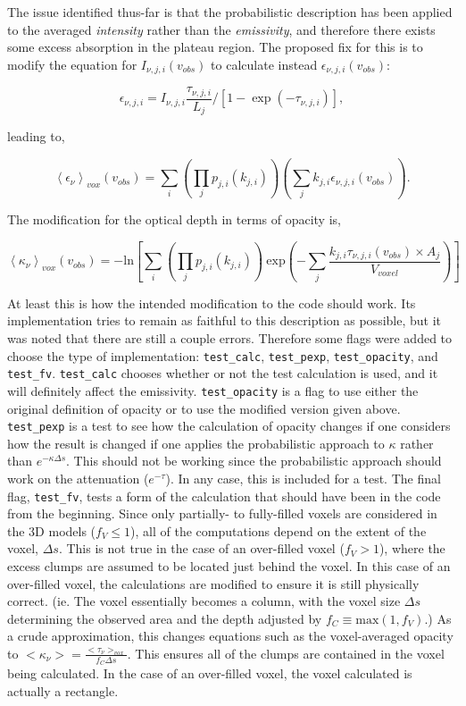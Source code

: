 \documentclass[a4paper]{article}
\begin{document}
    The issue identified thus-far is that the probabilistic description has been applied to the averaged \textit{intensity} rather than the \textit{emissivity}, and therefore there exists some excess absorption in the plateau region.
    The proposed fix for this is to modify the equation for \(I_{\nu, j, i} (v_{obs})\) to calculate instead \(\epsilon_{\nu, j, i} (v_{obs})\):

    \[
    \epsilon_{\nu,j,i} = I_{\nu,j,i} \frac{\tau_{\nu,j,i}} {L_{j}} / [ 1 - \exp(-\tau_{\nu,j,i}) ],
    \]

    leading to,

    \[
    \left< \epsilon_\nu \right>_{vox} (v_{obs}) = \sum_i \left( \prod_j p_{j,i}(k_{j,i}) \right) \left( \sum_j k_{j,i} \epsilon_{\nu,j,i} (v_{obs}) \right).
    \]

    The modification for the optical depth in terms of opacity is,

    \[
    \left< \kappa_\nu \right>_{vox} (v_{obs}) = -\mathrm{ln} \left[ \sum_i \left( \prod_j p_{j,i}(k_{j,i}) \right) \ \mathrm{exp} \left( - \sum_j \frac{k_{j,i} \tau_{\nu,j,i} (v_{obs}) \times A_{j}}{V_{voxel}} \right) \right]
    \]

    At least this is how the intended modification to the code should work.
    Its implementation tries to remain as faithful to this description as possible, but it was noted that there are still a couple errors.
    Therefore some flags were added to choose the type of implementation: \texttt{test\_calc}, \texttt{test\_pexp}, \texttt{test\_opacity}, and \texttt{test\_fv}.
    \texttt{test\_calc} chooses whether or not the test calculation is used, and it will definitely affect the emissivity.
    \texttt{test\_opacity} is a flag to use either the original definition of opacity or to use the modified version given above.
    \texttt{test\_pexp} is a test to see how the calculation of opacity changes if one considers how the result is changed if one applies the probabilistic approach to \(\kappa\) rather than \(e^{-\kappa \Delta s}\).
    This should not be working since the probabilistic approach should work on the attenuation (\(e^{-\tau}\)).
    In any case, this is included for a test.
    The final flag, \texttt{test\_fv}, tests a form of the calculation that should have been in the code from the beginning.
    Since only partially- to fully-filled voxels are considered in the 3D models (\(f_V \leq 1\)), all of the computations depend on the extent of the voxel, \(\Delta s\).
    This is not true in the case of an over-filled voxel (\(f_V > 1\)), where the excess clumps are assumed to be located just behind the voxel.
    In this case of an over-filled voxel, the calculations are modified to ensure it is still physically correct.
    (ie. The voxel essentially becomes a column, with the voxel size \(\Delta s\) determining the observed area and the depth adjusted by \(f_C \equiv \mathrm{max}(1, f_V)\).)
    As a crude approximation, this changes equations such as the voxel-averaged opacity to \(<\kappa_\nu> = \frac{<\tau_\nu>_{vox}}{f_C \Delta s}\).
    This ensures all of the clumps are contained in the voxel being calculated.
    In the case of an over-filled voxel, the voxel calculated is actually a rectangle.
\end{document}
